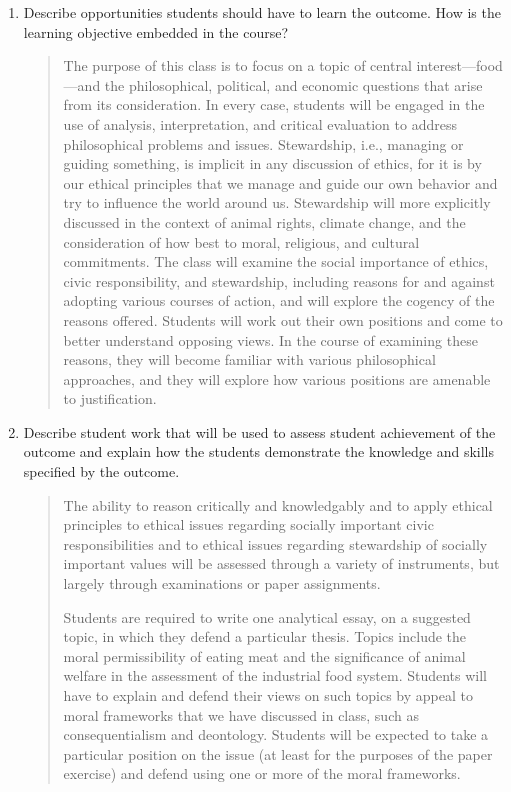 \documentclass[11pt]{article}
\begin{document}
\begin{enumerate}
\item Describe opportunities students should have to learn the outcome. How is the learning objective embedded in the course?

\begin{quote}
The purpose of this class is to focus on a topic of central
interest---food---and the philosophical, political, and economic questions
that arise from its consideration. In every case, students will be engaged
in the use of analysis, interpretation, and critical evaluation to address
philosophical problems and issues. Stewardship, i.e., managing or guiding
something, is implicit in any discussion of ethics, for it is by our ethical
principles that we manage and guide our own behavior and try to influence
the world around us. Stewardship will more explicitly discussed in the
context of animal rights, climate change, and the consideration of how best
to moral, religious, and cultural commitments. The class will examine the
social importance of ethics, civic responsibility, and stewardship,
including reasons for and against adopting various courses of action, and
will explore the cogency of the reasons offered. Students will work out their
own positions and come to better understand opposing views. In the course of
examining these reasons, they will become familiar with various
philosophical approaches, and they will explore how various positions are
amenable to justification.
\end{quote}

\item Describe student work that will be used to assess student achievement of the outcome and explain how the students demonstrate the knowledge and skills specified by the outcome.

\begin{quote}
The ability to reason critically and knowledgably and to apply ethical principles to ethical issues regarding socially important civic responsibilities and to ethical issues regarding stewardship of socially important values will be assessed through a variety of instruments, but largely through examinations or paper assignments.

Students are required to write one analytical essay, on a suggested topic, in
which they defend a particular thesis. Topics include the moral permissibility
of eating meat and the significance of animal welfare in the assessment of the
industrial food system. Students will have to explain and defend their views on
such topics by appeal to moral frameworks that we have discussed in class, such
as consequentialism and deontology. Students will be expected to take a
particular position on the issue (at least for the purposes of the paper
exercise) and defend using one or more of the moral frameworks.


\end{quote}
\end{enumerate}
\end{document}
